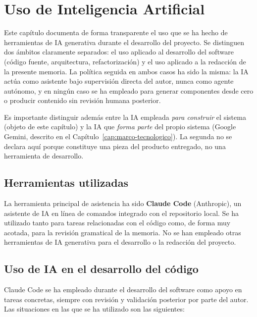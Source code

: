 
\chapter{Uso de Inteligencia Artificial}\label{cap:uso-ia}

Este capítulo documenta de forma transparente el uso que se ha hecho de herramientas de IA generativa durante el desarrollo del proyecto. Se distinguen dos ámbitos claramente separados: el uso aplicado al desarrollo del software (código fuente, arquitectura, refactorización) y el uso aplicado a la redacción de la presente memoria. La política seguida en ambos casos ha sido la misma: la IA actúa como asistente bajo supervisión directa del autor, nunca como agente autónomo, y en ningún caso se ha empleado para generar componentes desde cero o producir contenido sin revisión humana posterior.

Es importante distinguir además entre la IA empleada \textit{para construir} el sistema (objeto de este capítulo) y la IA que \textit{forma parte} del propio sistema (Google Gemini, descrito en el Capítulo~\ref{cap:marco-tecnologico}). La segunda no se declara aquí porque constituye una pieza del producto entregado, no una herramienta de desarrollo.

\section{Herramientas utilizadas}\label{sec:ia-herramientas}

La herramienta principal de asistencia ha sido \textbf{Claude Code} (Anthropic), un asistente de IA en línea de comandos integrado con el repositorio local. Se ha utilizado tanto para tareas relacionadas con el código como, de forma muy acotada, para la revisión gramatical de la memoria. No se han empleado otras herramientas de IA generativa para el desarrollo o la redacción del proyecto.

\section{Uso de IA en el desarrollo del código}\label{sec:ia-codigo}

Claude Code se ha empleado durante el desarrollo del software como apoyo en tareas concretas, siempre con revisión y validación posterior por parte del autor. Las situaciones en las que se ha utilizado son las siguientes:

